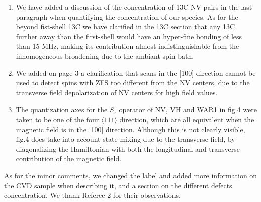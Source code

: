 \documentclass{article}
\begin{document}
\begin{enumerate}
\item We have added a discussion of the concentration of 13C-NV pairs in the last paragraph when quantifying the concentration of our species. As for the beyond fist-shell 13C we have clarified in the 13C section that any 13C further away than the first-shell would have an hyper-fine bonding of less than 15 MHz, making its contribution almost indistinguishable from the inhomogeneous broadening due to the ambiant spin bath.
\item We added on page 3 a clarification that scans in the [100] direction cannot be used to detect spins with ZFS too different from the NV centers, due to the transverse field depolarization of NV centers for high field values.
\item The quantization axes for the $S_z$ operator of NV, VH and WAR1 in fig.4 were taken to be one of the four $\langle 111 \rangle$ direction, which are all equivalent when the magnetic field is in the [100] direction. Although this is not clearly visible, fig.4 does take into account state mixing due to the transverse field, by diagonalizing the Hamiltonian with both the longitudinal and transverse contribution of the magnetic field. 
\end{enumerate}


As for the minor comments, we changed the label and added more information on the CVD sample when describing it, and a section on the different defects concentration. We thank Referee 2 for their observations.
\end{document}
